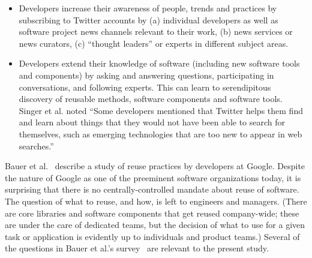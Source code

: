 \documentclass{casicswhitepaper}
\begin{document}
\begin{itemize}

\item Developers increase their awareness of people, trends and practices by subscribing to Twitter accounts by (a) individual developers as well as software project news channels relevant to their work, (b) news services or news curators, (c) ``thought leaders'' or experts in different subject areas.  

\item Developers extend their knowledge of software (including new software tools and components) by asking and answering questions, participating in conversations, and following experts.  This can learn to serendipitous discovery of reusable methods, software components and software tools.  Singer et al. noted ``Some developers mentioned that Twitter helps them find and learn about things that they would not have been able to search for themselves, such as emerging technologies that are too new to appear in web searches.''

\end{itemize}

Bauer et al.~\cite{bauer2014exploratory} describe a study of reuse practices by developers at Google.  Despite the nature of Google as one of the preeminent software organizations today, it is surprising that there is no centrally-controlled mandate about reuse of software.  The question of what to reuse, and how, is left to engineers and managers.  (There are core libraries and software components that get reused company-wide; these are under the care of dedicated teams, but the decision of what to use for a given task or application is evidently up to individuals and product teams.)  Several of the questions in Bauer et al.'s survey~\cite{bauer2014exploratory} are relevant to the present study.
\end{document}
